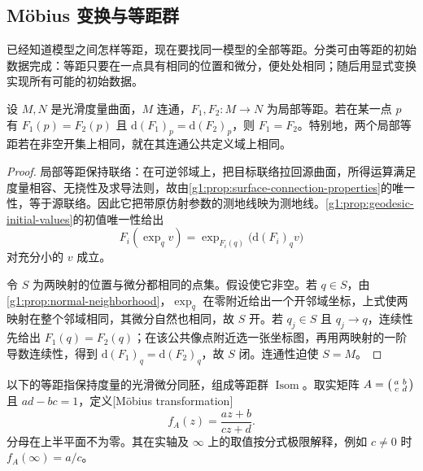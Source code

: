 \subsection{Möbius 变换与等距群}
\label{g1:subsec:1001:04}

已经知道模型之间怎样等距，现在要找同一模型的全部等距。分类可由等距的初始数据完成：等距只要在一点具有相同的位置和微分，便处处相同；随后用显式变换实现所有可能的初始数据。

\begin{proposition}
	\label{g1:prop:isometry-initial-data}
	设 \(M,N\) 是光滑度量曲面，\(M\) 连通，\(F_1,F_2:M\to N\) 为局部等距。若在某一点 \(p\) 有 \(F_1(p)=F_2(p)\) 且 \(\mathrm{d}(F_1)_p=\mathrm{d}(F_2)_p\)，则 \(F_1=F_2\)。特别地，两个局部等距若在非空开集上相同，就在其连通公共定义域上相同。
\end{proposition}
\begin{proof}
	局部等距保持联络：在可逆邻域上，把目标联络拉回源曲面，所得运算满足度量相容、无挠性及求导法则，故由\cref{g1:prop:surface-connection-properties}的唯一性，等于源联络。因此它把带原仿射参数的测地线映为测地线。\cref{g1:prop:geodesic-initial-values}的初值唯一性给出
	\[
		F_i(\exp_qv)=\exp_{F_i(q)}\bigl(\mathrm{d}(F_i)_qv\bigr)
	\]
	对充分小的 \(v\) 成立。

	令 \(S\) 为两映射的位置与微分都相同的点集。假设使它非空。若 \(q\in S\)，由\cref{g1:prop:normal-neighborhood}，\(\exp_q\) 在零附近给出一个开邻域坐标，上式使两映射在整个邻域相同，其微分自然也相同，故 \(S\) 开。若 \(q_j\in S\) 且 \(q_j\to q\)，连续性先给出 \(F_1(q)=F_2(q)\)；在该公共像点附近选一张坐标图，再用两映射的一阶导数连续性，得到 \(\mathrm{d}(F_1)_q=\mathrm{d}(F_2)_q\)，故 \(S\) 闭。连通性迫使 \(S=M\)。
\end{proof}

以下的等距指保持度量的光滑微分同胚，组成等距群 \(\operatorname{Isom}\)。取实矩阵 \(A=\begin{psmallmatrix}a&b\\c&d\end{psmallmatrix}\) 且 \(ad-bc=1\)，定义[Möbius transformation]
\[
	f_A(z)=\frac{az+b}{cz+d}.
\]
分母在上半平面不为零。其在实轴及 \(\infty\) 上的取值按分式极限解释，例如 \(c\ne0\) 时 \(f_A(\infty)=a/c\)。

